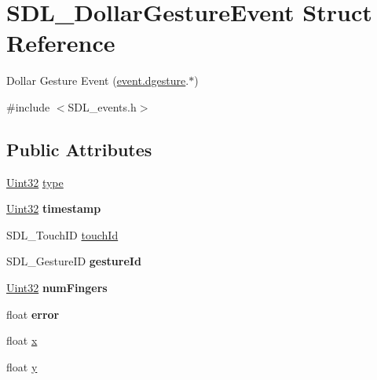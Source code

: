 \hypertarget{structSDL__DollarGestureEvent}{}\section{S\+D\+L\+\_\+\+Dollar\+Gesture\+Event Struct Reference}
\label{structSDL__DollarGestureEvent}


Dollar Gesture Event (\hyperlink{unionSDL__Event_a4481167b9f8549aeb254e97ca812e74d}{event.\+dgesture}.$\ast$)  




{\ttfamily \#include $<$S\+D\+L\+\_\+events.\+h$>$}

\subsection*{Public Attributes}
\begin{DoxyCompactItemize}
\item 
\hyperlink{SDL__stdinc_8h_add440eff171ea5f55cb00c4a9ab8672d}{Uint32} \hyperlink{structSDL__DollarGestureEvent_ac7f6948754a1b2eb36edde043bf75ce9}{type}
\item 
\hypertarget{structSDL__DollarGestureEvent_a3bccd8ebdf30b79c0f4074f6471ec583}{}\hyperlink{SDL__stdinc_8h_add440eff171ea5f55cb00c4a9ab8672d}{Uint32} {\bfseries timestamp}\label{structSDL__DollarGestureEvent_a3bccd8ebdf30b79c0f4074f6471ec583}

\item 
S\+D\+L\+\_\+\+Touch\+I\+D \hyperlink{structSDL__DollarGestureEvent_a40402f6911ed0dba48e6b23aa02bd83d}{touch\+Id}
\item 
\hypertarget{structSDL__DollarGestureEvent_a68968438eae9e58208b14e8c954dec31}{}S\+D\+L\+\_\+\+Gesture\+I\+D {\bfseries gesture\+Id}\label{structSDL__DollarGestureEvent_a68968438eae9e58208b14e8c954dec31}

\item 
\hypertarget{structSDL__DollarGestureEvent_a14160d8bad8569f53dd18ed8f64d253f}{}\hyperlink{SDL__stdinc_8h_add440eff171ea5f55cb00c4a9ab8672d}{Uint32} {\bfseries num\+Fingers}\label{structSDL__DollarGestureEvent_a14160d8bad8569f53dd18ed8f64d253f}

\item 
\hypertarget{structSDL__DollarGestureEvent_a30aaa8fe0df93615e6692aa20e9c13eb}{}float {\bfseries error}\label{structSDL__DollarGestureEvent_a30aaa8fe0df93615e6692aa20e9c13eb}

\item 
float \hyperlink{structSDL__DollarGestureEvent_a9888449bd8842ed96494b4db16a6097b}{x}
\item 
float \hyperlink{structSDL__DollarGestureEvent_a293b2303acc1cfc63c167c5525e6eab5}{y}
\end{DoxyCompactItemize}


